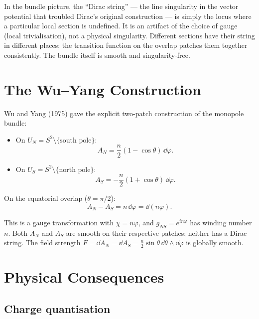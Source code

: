 In the bundle picture, the ``Dirac string'' --- the line singularity in the vector potential that troubled Dirac's original construction --- is simply the locus where a particular local section is undefined. It is an artifact of the choice of gauge (local trivialisation), not a physical singularity. Different sections have their string in different places; the transition function on the overlap patches them together consistently. The bundle itself is smooth and singularity-free.

\section{The Wu--Yang Construction}

Wu and Yang (1975) gave the explicit two-patch construction of the monopole bundle:

\begin{itemize}
\item On $U_N = S^2 \setminus \{\text{south pole}\}$:
\begin{equation}
A_N = \frac{n}{2}(1 - \cos\theta)\,\dd\varphi.
\end{equation}
\item On $U_S = S^2 \setminus \{\text{north pole}\}$:
\begin{equation}
A_S = -\frac{n}{2}(1 + \cos\theta)\,\dd\varphi.
\end{equation}
\end{itemize}

On the equatorial overlap ($\theta = \pi/2$):
\begin{equation}
A_N - A_S = n\,\dd\varphi = \dd(n\varphi).
\end{equation}

This is a gauge transformation with $\chi = n\varphi$, and $g_{NS} = e^{in\varphi}$ has winding number $n$. Both $A_N$ and $A_S$ are smooth on their respective patches; neither has a Dirac string. The field strength $F = \dd A_N = \dd A_S = \frac{n}{2}\sin\theta\,\dd\theta\wedge\dd\varphi$ is globally smooth.

\section{Physical Consequences}

\subsection{Charge quantisation}

